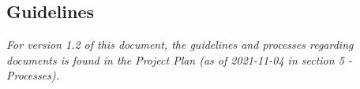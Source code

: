 \subsection{Guidelines}
\emph{For version 1.2 of this document, the guidelines and processes regarding documents is found in the Project Plan (as of 2021-11-04 in section 5 - Processes).}  
